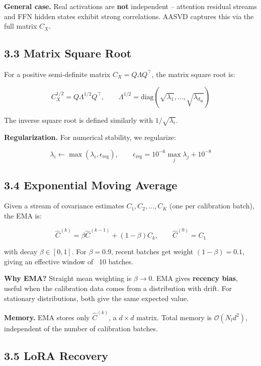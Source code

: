 \textbf{General case.} Real activations are \textbf{not} independent -- attention 
residual streams and FFN hidden states exhibit strong correlations. AASVD 
captures this via the full matrix $C_X$.

\subsection{3.3 Matrix Square Root}

For a positive semi-definite matrix $C_X = Q \Lambda Q^\top$, the matrix 
square root is:

\[
C_X^{1/2} = Q \Lambda^{1/2} Q^\top, \qquad
\Lambda^{1/2} = \mathrm{diag}(\sqrt{\lambda_1}, \dots, \sqrt{\lambda_{d_\text{in}}})
\tag{3.6}
\]

The inverse square root is defined similarly with $1/\sqrt{\lambda_i}$.

\textbf{Regularization.} For numerical stability, we regularize:

\[
\lambda_i \leftarrow \max(\lambda_i, \epsilon_\text{reg}), \qquad
\epsilon_\text{reg} = 10^{-6} \max_j \lambda_j + 10^{-8}
\tag{3.7}
\]

\subsection{3.4 Exponential Moving Average}

Given a stream of covariance estimates $C_1, C_2, \dots, C_K$ (one per 
calibration batch), the EMA is:

\[
\hat{C}^{(k)} = \beta \hat{C}^{(k-1)} + (1 - \beta) C_k, \qquad
\hat{C}^{(0)} = C_1
\tag{3.8}
\]

with decay $\beta \in [0, 1]$. For $\beta = 0.9$, recent batches get weight 
$(1 - \beta) = 0.1$, giving an effective window of ~10 batches.

\textbf{Why EMA?} Straight mean weighting is $\beta \to 0$. EMA gives 
\textbf{recency bias}, useful when the calibration data comes from a distribution 
with drift. For stationary distributions, both give the same expected value.

\textbf{Memory.} EMA stores only $\hat{C}^{(k)}$, a $d \times d$ matrix. Total 
memory is $\mathcal{O}(N_l d^2)$, independent of the number of calibration 
batches.

\subsection{3.5 LoRA Recovery}

